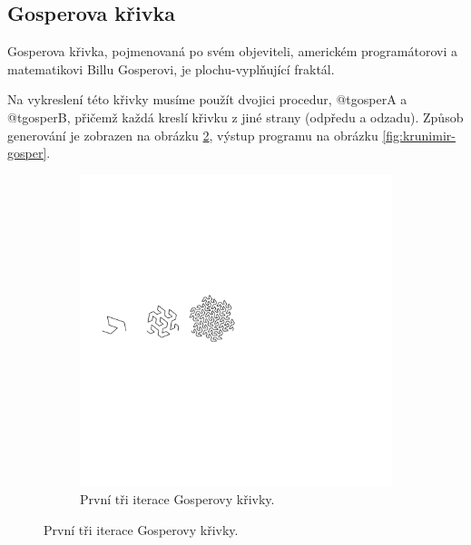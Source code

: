 \subsection{Gosperova křivka}

Gosperova křivka, pojmenovaná po svém objeviteli, americkém programátorovi a
matematikovi Billu Gosperovi, je plochu-vyplňující fraktál.
\cite{wiki:gosper-curve}

Na vykreslení této křivky musíme použít dvojici procedur, @t{gosperA} a
@t{gosperB}, přičemž každá kreslí křivku z jiné strany (odpředu a odzadu).
Způsob generování je zobrazen na obrázku \ref{fig:krunimir-gosper-gen}, výstup
programu na obrázku \ref{fig:krunimir-gosper}.



\begin{figure}
  \centering
  \caption{Gosperova křivka}
  \label{fig:krunimir-gosper-all}

  \begin{subfigure}{0.8\textwidth}
    \includegraphics[width=\textwidth,trim=0 250 250 200]{krunimir/examples/gosper-gen}
    \caption{První tři iterace Gosperovy křivky.}
    \label{fig:krunimir-gosper-gen}
  \end{subfigure}


\end{figure}
